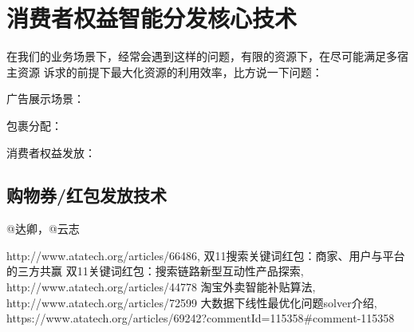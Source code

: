 
\chapter{消费者权益智能分发核心技术}
\thispagestyle{empty}

\setlength{\fboxrule}{0pt}\setlength{\fboxsep}{0cm}
\noindent\shadowbox{
\begin{tcolorbox}[arc=0mm,colback=lightblue,colframe=darkblue,title=学习目标与要求]

\end{tcolorbox}}
\setlength{\fboxrule}{1pt}\setlength{\fboxsep}{4pt} 


在我们的业务场景下，经常会遇到这样的问题，有限的资源下，在尽可能满足多宿主资源
诉求的前提下最大化资源的利用效率，比方说一下问题： 
\begin{description}
	\item 广告展示场景：
	\item 包裹分配：
	\item 消费者权益发放：
\end{description}





\section{购物券/红包发放技术} 
	@达卿，@云志



\begin{thebibliography}{99}
 http://www.atatech.org/articles/66486, 双11搜索关键词红包：商家、用户与平台的三方共赢
 双11关键词红包：搜索链路新型互动性产品探索, http://www.atatech.org/articles/44778
 淘宝外卖智能补贴算法, http://www.atatech.org/articles/72599 
 大数据下线性最优化问题solver介绍, https://www.atatech.org/articles/69242?commentId=115358#comment-115358

\end{thebibliography}

 
